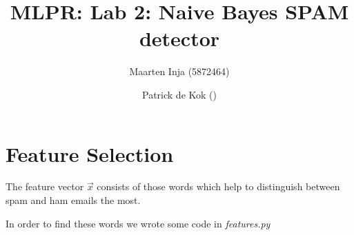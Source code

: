 \documentclass[a4paper,11pt]{article}
\author{Maarten Inja (5872464) \and Patrick de Kok ()}
\title{MLPR: Lab 2: Naive Bayes SPAM detector}
\begin{document}
\maketitle

\section*{Feature Selection}
The feature vector $\vec{x}$ consists of those words which 
help to distinguish between spam and ham emails the most. 

In order to find these words we wrote some code in \textit{features.py}
\end{document}
